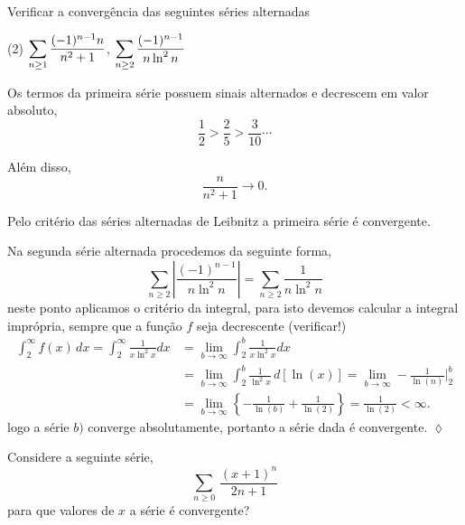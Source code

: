 \begin{exer}
Verificar a converg\^{e}ncia das seguintes s\'{e}ries alternadas
\begin{tasks}[label=(\alph*),item-indent=6em,label-width=4ex,ref=(\alph*)](2)
\task  \(\displaystyle \sum_{n\geq1}\frac{(-1)^{n-1}n}{n^2+1}\),
\task  \(\displaystyle \sum_{n\geq 2}\frac{(-1)^{n-1}}{n\ln^2 n}\)
\end{tasks}
\end{exer}

\solo Os termos da primeira s\'{e}rie possuem sinais alternados e
decrescem em valor absoluto,
\begin{equation*}
\dfrac{1}{2}>\dfrac{2}{5}>\dfrac{3}{10}\cdots
\end{equation*}

Al\'{e}m disso,
\begin{equation*}
    \frac{n}{n^2+1}\to 0.
\end{equation*}

Pelo crit\'{e}rio das s\'{e}ries alternadas de Leibnitz a primeira s\'{e}rie \'{e}
convergente.

Na segunda s\'{e}rie alternada procedemos da seguinte forma,
\begin{equation*}
\sum_{n\geq 2}\left|\frac{(-1)^{n-1}}{n\ln^2 n}\right|=\sum_{n\geq
2}\frac{1}{n\ln^2 n}
\end{equation*}
neste ponto aplicamos o crit\'{e}rio da integral, para isto devemos
calcular a integral impr\'{o}pria, sempre que a fun\c{c}\~{a}o $f$ seja
decrescente (verificar!)
\begin{align*}
    \int_2^{\infty}\!f(x)\,dx=\int_2^{\infty}\!\frac{1}{x\ln^2 x}dx&=\lim_{b\to \infty}\int_2^{b}\frac{1}{x\ln^2
    x}dx\\[2ex]
    &=\lim_{b\to \infty}\int_2^{b}\frac{1}{\ln^2 x}\,d[\ln(x)]=\lim_{b\to
    \infty}-\frac{1}{\ln(n)}\Bigg|_2^b\\[2ex]
    &=\lim_{b\to
    \infty}\left\{-\frac{1}{\ln(b)}+\frac{1}{\ln(2)}\right\}=\frac{1}{\ln(2)}<\infty.
\end{align*}
logo a s\'{e}rie $b)$ converge absolutamente, portanto a s\'{e}rie dada \'{e}
convergente. \hfill \(\lozenge\)

\begin{exer}
Considere a seguinte s\'{e}rie,
\begin{equation*}
\sum_{n\geq 0}\,\frac{(x+1)^n}{2n+1}
\end{equation*}
para que valores de $x$ a s\'{e}rie \'{e} convergente?
\end{exer}

